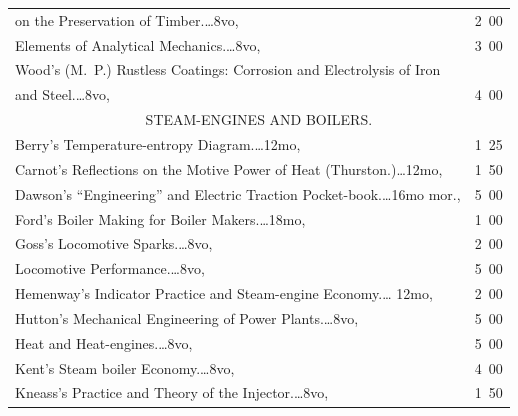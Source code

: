\documentclass[a4paper,12pt]{book}[2004/02/16]
\theoremstyle{ilemma}
\theoremstyle{itheorem}
\theoremstyle{iother}
\theoremstyle{icorollary}
\theoremstyle{numcorollary}
\theoremstyle{idefinition}
\begin{document}
\begin{longtable}{@{}l@{ }r@{}}
\nopagebreak

\indent\indent on the Preservation of Timber.\dotfill\ldots 8vo, &2\ 00\\

\indent Elements of Analytical Mechanics.\dotfill\ldots 8vo, &3\ 00\\

Wood's (M.~P.) Rustless Coatings: Corrosion and Electrolysis of Iron\\

\indent\indent and Steel.\dotfill\ldots 8vo, &4\ 00\\[2em]



\multicolumn{2}{c}{STEAM-ENGINES AND BOILERS.}\\[1em]

\nopagebreak

Berry's Temperature-entropy Diagram.\dotfill\ldots 12mo, &1\ 25\\

Carnot's Reflections on the Motive Power of Heat
(Thurston.)\dotfill\ldots 12mo, &1\ 50\\

Dawson's ``Engineering'' and Electric Traction
Pocket-book.\dotfill\ldots 16mo mor., &5\ 00\\

Ford's Boiler Making for Boiler Makers.\dotfill\ldots 18mo, &1\ 00\\

Goss's Locomotive Sparks.\dotfill\ldots 8vo, &2\ 00\\

\indent Locomotive Performance.\dotfill\ldots 8vo, & 5\ 00\\

Hemenway's Indicator Practice and Steam-engine Economy.\dotfill\ldots
12mo, &2\ 00\\



Hutton's Mechanical Engineering of Power Plants.\dotfill\ldots 8vo, &5\ 00\\

\indent Heat and Heat-engines.\dotfill\ldots 8vo, &5\ 00\\

Kent's Steam boiler Economy.\dotfill\ldots 8vo, &4\ 00\\

Kneass's Practice and Theory of the Injector.\dotfill\ldots 8vo, &1\ 50\\


\end{longtable}
\end{document}
